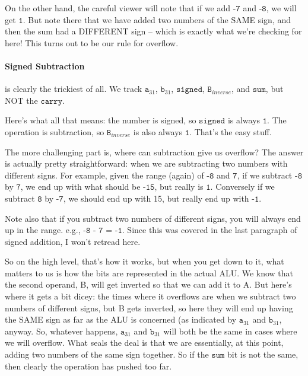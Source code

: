 \documentclass[a4paper]{article}
\begin{document}
On the other hand, the careful viewer will note that if we add $\texttt{-7}$ and $\texttt{-8}$, we will get $\texttt{1}$. But note there that we have added two numbers of the SAME sign, and then the sum had a DIFFERENT sign -- which is exactly what we're checking for here! This turns out to be our rule for overflow.

\paragraph*{Signed Subtraction} is clearly the trickiest of all. We track $\texttt{a}_{31}$, $\texttt{b}_{31}$, $\texttt{signed}$, $\texttt{B}_{inverse}$, and $\texttt{sum}$, but NOT the $\texttt{carry}$.

Here's what all that means: the number is signed, so $\texttt{signed}$ is always $\texttt{1}$. The operation is subtraction, so $\texttt{B}_{inverse}$ is also always $\texttt{1}$. That's the easy stuff.

The more challenging part is, where can subtraction give us overflow? The answer is actually pretty straightforward: when we are subtracting two numbers with different signs. For example, given the range (again) of $\texttt{-8}$ and $\texttt{7}$, if we subtract $\texttt{-8}$ by $\texttt{7}$, we end up with what should be $\texttt{-15}$, but really is $\texttt{1}$. Conversely if we subtract $\texttt{8}$ by $\texttt{-7}$, we should end up with 15, but really end up with $\texttt{-1}$.

Note also that if you subtract two numbers of different signs, you will always end up in the range. e.g., $\texttt{-8 - 7 = -1}$. Since this was covered in the last paragraph of signed addition, I won't retread here.

So on the high level, that's how it works, but when you get down to it, what matters to us is how the bits are represented in the actual ALU. We know that the second operand, B, will get inverted so that we can add it to A. But here's where it gets a bit dicey: the times where it overflows are when we subtract two numbers of different signs, but B gets inverted, so here they will end up having the SAME sign as far as the ALU is concerned (as indicated by $\texttt{a}_{31}$ and $\texttt{b}_{31}$, anyway. So, whatever happens, $\texttt{a}_{31}$ and $\texttt{b}_{31}$ will both be the same in cases where we will overflow. What seals the deal is that we are essentially, at this point, adding two numbers of the same sign together. So if the $\texttt{sum}$ bit is not the same, then clearly the operation has pushed too far.
\end{document}
